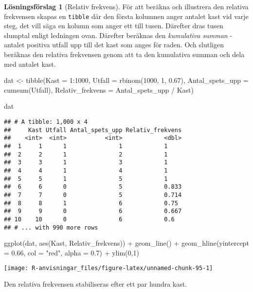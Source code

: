 \documentclass[
]{book}
\newenvironment{Shaded}{\begin{snugshade}}{\end{snugshade}}
\newcommand{\AttributeTok}[1]{\textcolor[rgb]{0.77,0.63,0.00}{#1}}
\newcommand{\DecValTok}[1]{\textcolor[rgb]{0.00,0.00,0.81}{#1}}
\newcommand{\FloatTok}[1]{\textcolor[rgb]{0.00,0.00,0.81}{#1}}
\newcommand{\FunctionTok}[1]{\textcolor[rgb]{0.00,0.00,0.00}{#1}}
\newcommand{\NormalTok}[1]{#1}
\newcommand{\OtherTok}[1]{\textcolor[rgb]{0.56,0.35,0.01}{#1}}
\newcommand{\SpecialCharTok}[1]{\textcolor[rgb]{0.00,0.00,0.00}{#1}}
\newcommand{\StringTok}[1]{\textcolor[rgb]{0.31,0.60,0.02}{#1}}
\theoremstyle{definition}
\theoremstyle{definition}
\theoremstyle{definition}
\theoremstyle{definition}
\newtheorem{hypothesis}{Lösningsförslag}[chapter]
\theoremstyle{remark}
\begin{document}
\begin{hypothesis}[Relativ frekvens]
För att beräkna och illustrera den relativa frekvensen skapas en \texttt{tibble} där den första kolumnen anger antalet kast vid varje steg, det vill säga en kolumn som anger ett till tusen. Därefter dras tusen slumptal enligt ledningen ovan. Därefter beräknas den \emph{kumulativa summan} - antalet positiva utfall upp till det kast som anges för raden. Och slutligen beräknas den relativa frekvensen genom att ta den kumulativa summan och dela med antalet kast.

\begin{Shaded}
\begin{Highlighting}[]
\NormalTok{dat }\OtherTok{\textless{}{-}} \FunctionTok{tibble}\NormalTok{(}\AttributeTok{Kast =} \DecValTok{1}\SpecialCharTok{:}\DecValTok{1000}\NormalTok{,}
              \AttributeTok{Utfall =} \FunctionTok{rbinom}\NormalTok{(}\DecValTok{1000}\NormalTok{, }\DecValTok{1}\NormalTok{, }\FloatTok{0.67}\NormalTok{),}
              \AttributeTok{Antal\_spets\_upp =} \FunctionTok{cumsum}\NormalTok{(Utfall),}
              \AttributeTok{Relativ\_frekvens =}\NormalTok{ Antal\_spets\_upp }\SpecialCharTok{/}\NormalTok{ Kast)}

\NormalTok{dat}
\end{Highlighting}
\end{Shaded}

\begin{verbatim}
## # A tibble: 1,000 x 4
##     Kast Utfall Antal_spets_upp Relativ_frekvens
##    <int>  <int>           <int>            <dbl>
##  1     1      1               1            1    
##  2     2      1               2            1    
##  3     3      1               3            1    
##  4     4      1               4            1    
##  5     5      1               5            1    
##  6     6      0               5            0.833
##  7     7      0               5            0.714
##  8     8      1               6            0.75 
##  9     9      0               6            0.667
## 10    10      0               6            0.6  
## # ... with 990 more rows
\end{verbatim}

\begin{Shaded}
\begin{Highlighting}[]
\FunctionTok{ggplot}\NormalTok{(dat, }\FunctionTok{aes}\NormalTok{(Kast, Relativ\_frekvens)) }\SpecialCharTok{+}
  \FunctionTok{geom\_line}\NormalTok{() }\SpecialCharTok{+}
  \FunctionTok{geom\_hline}\NormalTok{(}\AttributeTok{yintercept =} \FloatTok{0.66}\NormalTok{, }\AttributeTok{col =} \StringTok{"red"}\NormalTok{, }\AttributeTok{alpha =} \FloatTok{0.7}\NormalTok{) }\SpecialCharTok{+}
  \FunctionTok{ylim}\NormalTok{(}\DecValTok{0}\NormalTok{,}\DecValTok{1}\NormalTok{)}
\end{Highlighting}
\end{Shaded}

\begin{center}\texttt{[image: R-anvisningar\_files/figure-latex/unnamed-chunk-95-1]} \end{center}

Den relativa frekvensen stabiliseras efter ett par hundra kast.
\end{hypothesis}
\end{document}
